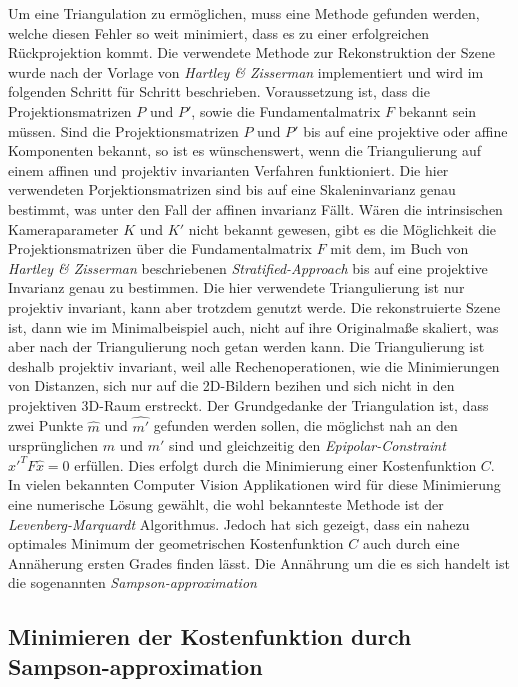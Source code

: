 Um eine Triangulation zu ermöglichen, muss eine Methode gefunden werden, welche diesen Fehler so weit minimiert, dass es zu einer erfolgreichen Rückprojektion kommt. Die verwendete Methode zur Rekonstruktion der Szene wurde nach der Vorlage von \textit{Hartley \& Zisserman}\cite{HZ} implementiert und wird im folgenden Schritt für Schritt beschrieben. Voraussetzung ist, dass die Projektionsmatrizen $P$ und $P'$, sowie die Fundamentalmatrix $F$ bekannt sein müssen. Sind die Projektionsmatrizen $P$ und $P'$ bis auf eine projektive oder affine Komponenten bekannt, so ist es wünschenswert, wenn die Triangulierung auf einem affinen und projektiv invarianten Verfahren funktioniert\cite{HZ}. Die hier verwendeten Porjektionsmatrizen sind bis auf eine Skaleninvarianz genau bestimmt, was unter den Fall der affinen invarianz Fällt. Wären die intrinsischen Kameraparameter $K$ und $K'$ nicht bekannt gewesen, gibt es die Möglichkeit die Projektionsmatrizen über die Fundamentalmatrix $F$ mit dem, im Buch von \textit{Hartley \& Zisserman} beschriebenen  \textit{Stratified-Approach} bis auf eine projektive Invarianz genau zu bestimmen\cite{HZ}. Die hier verwendete Triangulierung ist nur projektiv invariant, kann aber trotzdem genutzt werde. Die rekonstruierte Szene ist, dann wie im Minimalbeispiel auch, nicht auf ihre Originalmaße skaliert, was aber nach der Triangulierung noch getan werden kann. Die Triangulierung ist deshalb projektiv invariant, weil alle Rechenoperationen, wie die Minimierungen von Distanzen, sich nur auf die 2D-Bildern bezihen und sich nicht in den projektiven 3D-Raum erstreckt\cite{HZ}. Der Grundgedanke der Triangulation ist, dass zwei Punkte $\hat{m}$ und $\hat{m'}$ gefunden werden sollen, die möglichst nah an den ursprünglichen $m$ und $m'$ sind und gleichzeitig den \textit{Epipolar-Constraint} $\hat{x}'^TF\hat{x} = 0$ erfüllen. Dies erfolgt durch die Minimierung einer Kostenfunktion $C$. In vielen bekannten Computer Vision Applikationen wird für diese Minimierung eine numerische Lösung gewählt, die wohl bekannteste Methode ist der \textit{Levenberg-Marquardt} Algorithmus\cite{HZ}. Jedoch hat sich gezeigt, dass ein nahezu optimales Minimum der geometrischen Kostenfunktion $C$ auch durch eine Annäherung ersten Grades finden lässt. Die Annährung um die es sich handelt ist die sogenannten \textit{Sampson-approximation}


\subsection{Minimieren der Kostenfunktion durch Sampson-approximation}
\label{sec:sampson}


